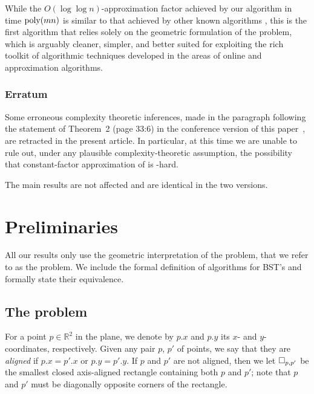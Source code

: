 \documentclass[11pt]{article}
\numberwithin{equation}{section}
\theoremstyle{definition}
\theoremstyle{plain}
\begin{document}
While the $O(\log\log n)$-approximation factor achieved by our algorithm in time $\operatorname{poly}(mn)$ is similar to that achieved by other known algorithms  \cite{tango,chain_splay,multisplay}, this is the first algorithm that relies solely on the geometric formulation of the problem, which is arguably cleaner, simpler, and better suited for exploiting the rich toolkit of algorithmic techniques developed in the areas of online and approximation algorithms.

\subsubsection{Erratum} 
Some erroneous complexity theoretic inferences, made
%
%
in the paragraph following the statement of Theorem~2 (page 33:6) %
in the conference version of this paper~\cite{conf-version}, %
are retracted in the present article.  
%
In particular, at this time we are unable to rule out, under any
plausible complexity-theoretic assumption, the possibility
that constant-factor approximation of \minsat is \NP-hard.  %
%
%

The main results are not affected and are identical in the two versions. 

%

\section{Preliminaries}\label{sec: prelims}

%

All our results only use the geometric interpretation of the problem, that we refer to as the \minsat problem. 
We include the formal definition of algorithms for BST's and formally state their equivalence.  
%


%

	\subsection{The \minsat problem}
	\label{sec: problem def}

	For a point $p \in {\mathbb R}^2$ in the plane, we denote by $p.x$ and $p.y$ its $x$- and $y$-coordinates, respectively. 
	Given any pair $p$, $p'$ of points, we say that they are \emph{aligned} if $p.x=p'.x$ or $p.y=p'.y$. If $p$ and $p'$ are not aligned, then we let $\Box_{p,p'}$ be the smallest closed axis-aligned rectangle containing both $p$ and $p'$; note that $p$ and $p'$ must be diagonally opposite corners of the rectangle.
	 
\end{document}
